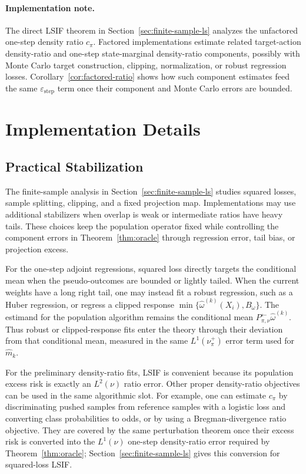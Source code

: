 \documentclass{article}
\newcommand{\mhat}{\widehat m}
\newcommand{\1}{\mathbf{1}}
\newcommand{\nup}{\nu_\pi^+}
\newcommand{\cpi}{c_\pi}
\newcommand{\Pback}{P_{\pi,\nu}^{\leftarrow}}
\newcommand{\Mpi}{\Pback}
\newcommand{\omegahat}{\widehat{\omega}}
\theoremstyle{plain}
\theoremstyle{definition}
\theoremstyle{remark}
\begin{document}
\paragraph{Implementation note.}
The direct LSIF theorem in Section~\ref{sec:finite-sample-ls} analyzes the unfactored one-step density ratio $\cpi$.
Factored implementations estimate related target-action density-ratio and one-step state-marginal density-ratio components, possibly with Monte Carlo target construction, clipping, normalization, or robust regression losses.
Corollary~\ref{cor:factored-ratio} shows how such component estimates feed the same $\varepsilon_{\mathrm{step}}$ term once their component and Monte Carlo errors are bounded.


\section{Implementation Details}
\label{app:implementation}

\subsection{Practical Stabilization}
\label{sec:practical-stabilization}

The finite-sample analysis in Section~\ref{sec:finite-sample-ls} studies squared losses, sample splitting, clipping, and a fixed projection map.
Implementations may use additional stabilizers when overlap is weak or intermediate ratios have heavy tails.
These choices keep the population operator fixed while controlling the component errors in Theorem~\ref{thm:oracle} through regression error, tail bias, or projection excess.

For the one-step adjoint regressions, squared loss directly targets the conditional mean when the pseudo-outcomes are bounded or lightly tailed.
When the current weights have a long right tail, one may instead fit a robust regression, such as a Huber regression, or regress a clipped response $\min\{\omegahat^{(k)}(X_i),B_\omega\}$.
The estimand for the population algorithm remains the conditional mean $\Mpi\omegahat^{(k)}$.
Thus robust or clipped-response fits enter the theory through their deviation from that conditional mean, measured in the same $L^1(\nup)$ error term used for $\mhat_k$.

For the preliminary density-ratio fits, LSIF is convenient because its population excess risk is exactly an $L^2(\nu)$ ratio error.
Other proper density-ratio objectives can be used in the same algorithmic slot.
For example, one can estimate $\cpi$ by discriminating pushed samples from reference samples with a logistic loss and converting class probabilities to odds, or by using a Bregman-divergence ratio objective.
They are covered by the same perturbation theorem once their excess risk is converted into the $L^1(\nu)$ one-step density-ratio error required by Theorem~\ref{thm:oracle}; Section~\ref{sec:finite-sample-ls} gives this conversion for squared-loss LSIF.
\end{document}
